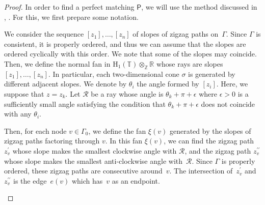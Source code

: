 \documentclass[11pt]{article}
\numberwithin{equation}{section}
\numberwithin{equation}{section}
\numberwithin{figure}{section}
\numberwithin{table}{section}
\newcommand{\ZZ}{\mathbb{Z}}
\newcommand{\RR}{\mathbb{R}}
\newcommand{\TT}{\mathbb{T}}
\newcommand{\rmH}{\mathrm{H}}
\newcommand{\calR}{\mathcal{R}}
\newcommand{\sfP}{\mathsf{P}}
\begin{document}
\begin{proof}
In order to find a perfect matching $\sfP$, we will use the method discussed in \cite[Section~3]{Gul}, \cite[Section~4]{Bro}.
For this, we first prepare some notation.

We consider the sequence $[z_1],\dots,[z_n]$ of slopes of zigzag paths on~$\Gamma$.
Since $\Gamma$ is consistent, it is properly ordered, and thus we can assume that the slopes are ordered cyclically with this order.
We note that some of the slopes may coincide.
Then, we define the normal fan in $\rmH_1(\TT)\otimes_\ZZ\RR$ whose rays are slopes $[z_1],\dots,[z_n]$.
In particular, each two-dimensional cone $\sigma$ is generated by different adjacent slopes.
We denote by $\theta_i$ the angle formed by $[z_i]$. Here, we suppose that $z=z_k$.
Let $\calR$ be a ray whose angle is $\theta_k+\pi+\epsilon$ where $\epsilon>0$ is a sufficiently small angle satisfying the condition that $\theta_k+\pi+\epsilon$ does not coincide with any $\theta_i$.

Then, for each node $v\in\Gamma_0$, we define the fan $\xi(v)$ generated by the slopes of zigzag paths factoring through $v$.
In this fan $\xi(v)$, we can find the zigzag path $z^\prime_v$ whose slope makes the smallest clockwise angle with $\calR$, and the zigzag path $z^{\prime\prime}_v$ whose slope makes the smallest anti-clockwise angle with~$\calR$.
Since $\Gamma$ is properly ordered, these zigzag paths are consecutive around~$v$.
The intersection of~$z^\prime_v$ and $z^{\prime\prime}_v$ is the edge~$e(v)$ which has~$v$ as an endpoint.

\begin{center}
{}
\end{center}
\end{proof}
\end{document}

